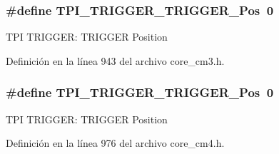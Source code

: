 \subsubsection[{\texorpdfstring{T\+P\+I\+\_\+\+T\+R\+I\+G\+G\+E\+R\+\_\+\+T\+R\+I\+G\+G\+E\+R\+\_\+\+Pos}{TPI_TRIGGER_TRIGGER_Pos}}]{\setlength{\rightskip}{0pt plus 5cm}\#define T\+P\+I\+\_\+\+T\+R\+I\+G\+G\+E\+R\+\_\+\+T\+R\+I\+G\+G\+E\+R\+\_\+\+Pos~0}\hypertarget{group___c_m_s_i_s___t_p_i_ga5517fa2ced64efbbd413720329c50b99}{}\label{group___c_m_s_i_s___t_p_i_ga5517fa2ced64efbbd413720329c50b99}
T\+PI T\+R\+I\+G\+G\+ER\+: T\+R\+I\+G\+G\+ER Position 

Definición en la línea 943 del archivo core\+\_\+cm3.\+h.

\subsubsection[{\texorpdfstring{T\+P\+I\+\_\+\+T\+R\+I\+G\+G\+E\+R\+\_\+\+T\+R\+I\+G\+G\+E\+R\+\_\+\+Pos}{TPI_TRIGGER_TRIGGER_Pos}}]{\setlength{\rightskip}{0pt plus 5cm}\#define T\+P\+I\+\_\+\+T\+R\+I\+G\+G\+E\+R\+\_\+\+T\+R\+I\+G\+G\+E\+R\+\_\+\+Pos~0}\hypertarget{group___c_m_s_i_s___t_p_i_ga5517fa2ced64efbbd413720329c50b99}{}\label{group___c_m_s_i_s___t_p_i_ga5517fa2ced64efbbd413720329c50b99}
T\+PI T\+R\+I\+G\+G\+ER\+: T\+R\+I\+G\+G\+ER Position 

Definición en la línea 976 del archivo core\+\_\+cm4.\+h.

